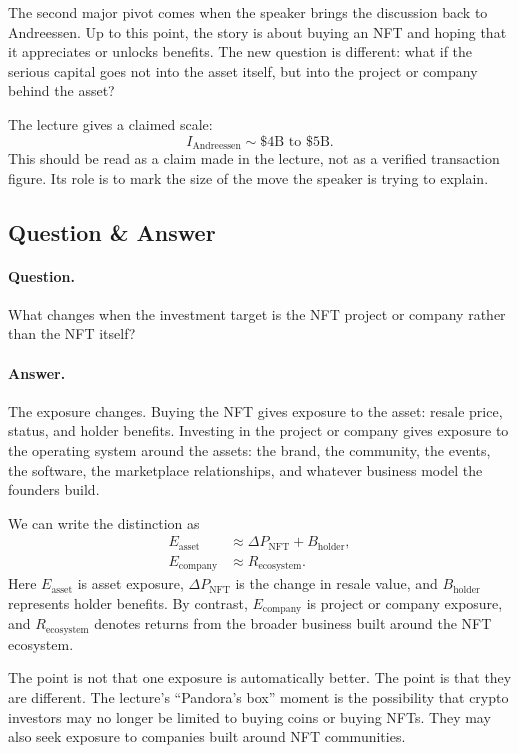 The second major pivot comes when the speaker brings the discussion back to Andreessen. Up to this point, the story is about buying an NFT and hoping that it appreciates or unlocks benefits. The new question is different: what if the serious capital goes not into the asset itself, but into the project or company behind the asset?

The lecture gives a claimed scale:
\begin{equation}
I_{\mathrm{Andreessen}} \sim \$4\mathrm{B} \text{ to } \$5\mathrm{B}.
\end{equation}
This should be read as a claim made in the lecture, not as a verified transaction figure. Its role is to mark the size of the move the speaker is trying to explain.

\subsection{Question \& Answer}

\paragraph{Question.}
What changes when the investment target is the NFT project or company rather than the NFT itself?

\paragraph{Answer.}
The exposure changes. Buying the NFT gives exposure to the asset: resale price, status, and holder benefits. Investing in the project or company gives exposure to the operating system around the assets: the brand, the community, the events, the software, the marketplace relationships, and whatever business model the founders build.

We can write the distinction as
\begin{align}
E_{\mathrm{asset}}
&\approx
\Delta P_{\mathrm{NFT}} + B_{\mathrm{holder}}, \\
E_{\mathrm{company}}
&\approx
R_{\mathrm{ecosystem}}.
\end{align}
Here \(E_{\mathrm{asset}}\) is asset exposure, \(\Delta P_{\mathrm{NFT}}\) is the change in resale value, and \(B_{\mathrm{holder}}\) represents holder benefits. By contrast, \(E_{\mathrm{company}}\) is project or company exposure, and \(R_{\mathrm{ecosystem}}\) denotes returns from the broader business built around the NFT ecosystem.

The point is not that one exposure is automatically better. The point is that they are different. The lecture's ``Pandora's box'' moment is the possibility that crypto investors may no longer be limited to buying coins or buying NFTs. They may also seek exposure to companies built around NFT communities.

